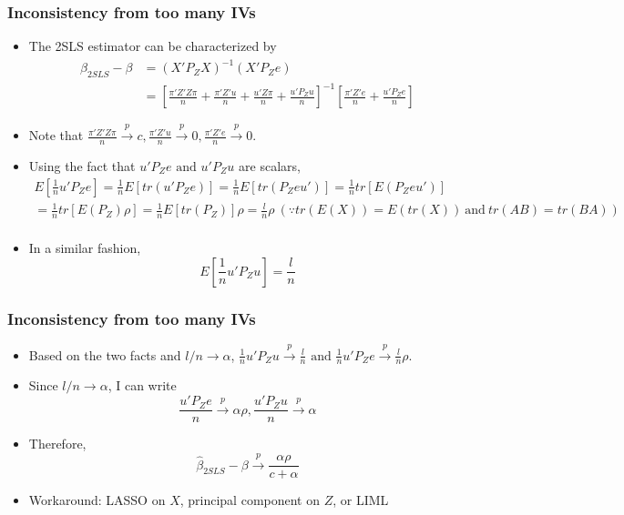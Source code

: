 \documentclass[aspectratio=169]{beamer}
\begin{document}
\begin{frame}
\frametitle{Inconsistency from too many IVs}
\begin{itemize}
\item The 2SLS estimator can be characterized by
\[
\begin{aligned}
\hat{\beta}_{2SLS}-\beta&=(X'P_ZX)^{-1}(X'P_Ze)\\
&=\left[\frac{\pi'Z'Z\pi}{n}+\frac{\pi'Z'u}{n}+\frac{u'Z\pi}{n}+\frac{u'P_Zu}{n}\right]^{-1}\left[\frac{\pi'Z'e}{n}+\frac{u'P_Ze}{n}\right]
\end{aligned}
\]
\item Note that $\frac{\pi'Z'Z\pi}{n}\xrightarrow{p}c, \frac{\pi'Z'u}{n}\xrightarrow{p}0, \frac{\pi'Z'e}{n}\xrightarrow{p}0$. 
\item Using the fact that $u'P_Ze \text{ and }u'P_Zu$ are scalars, 
\begin{gather*}
E\left[\frac{1}{n}u'P_Ze\right]=\frac{1}{n}E[tr(u'P_Ze)]=\frac{1}{n}E[tr(P_Zeu')]=\frac{1}{n}tr[E(P_Zeu')]\\
=\frac{1}{n}tr[E(P_Z)\rho]=\frac{1}{n}E[tr(P_Z)]\rho=\frac{l}{n}\rho \ (\because tr(E(X))=E(tr(X))\ \text{and}\ tr(AB)=tr(BA)) \\
\end{gather*}
\item In a similar fashion, 
\[
E\left[\frac{1}{n}u'P_Zu\right] = \frac{l}{n}
\]
\end{itemize}
\end{frame}

\begin{frame}
\frametitle{Inconsistency from too many IVs}
\begin{itemize}
\item Based on the two facts and $l/n\to\alpha$, $\frac{1}{n}u'P_Zu\xrightarrow{p} \frac{l}{n}\text{ and }\frac{1}{n}u'P_Ze\xrightarrow{p}\frac{l}{n}\rho$. 
\item Since $l/n\to\alpha$, I can write
\[
\frac{u'P_Ze}{n}\xrightarrow{p} \alpha\rho, \frac{u'P_Zu}{n}\xrightarrow{p} \alpha
\]
\item Therefore, 
\[
\hat{\beta}_{2SLS}-\beta\xrightarrow{p}\frac{\alpha\rho}{c+\alpha}
\]
\item Workaround: LASSO on $X$, principal component on $Z$, or LIML
\end{itemize}
\end{frame}
\end{document}
